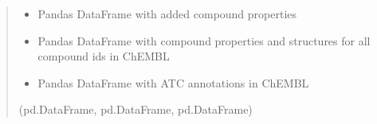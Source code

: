 \documentclass[letterpaper,10pt,english]{sphinxmanual}
\begin{document}
\begin{fulllineitems}
\begin{quote}
\begin{description}
\begin{itemize}
\end{itemize}

\sphinxAtStartPar
\begin{itemize}
\item {} 
\sphinxAtStartPar
Pandas DataFrame with added compound properties 

\item {} 
\sphinxAtStartPar
Pandas DataFrame with compound properties and structures for all compound ids in ChEMBL 

\item {} 
\sphinxAtStartPar
Pandas DataFrame with ATC annotations in ChEMBL

\end{itemize}


\sphinxAtStartPar
(pd.DataFrame, pd.DataFrame, pd.DataFrame)

\end{description}\end{quote}

\end{fulllineitems}

\end{document}
